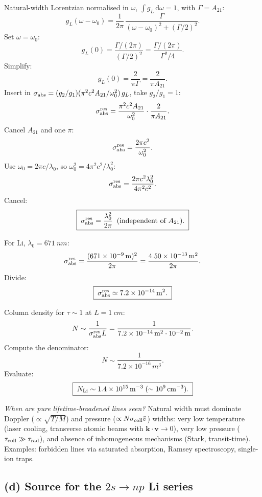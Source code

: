 \documentclass[11pt]{article}
\newcommand{\de}{\mathrm{d}}
\begin{document}
Natural-width Lorentzian normalised in $\omega$, $\int g_L\,\de\omega=1$, with $\Gamma=A_{21}$:
\[
g_L(\omega-\omega_0)=\frac{1}{2\pi}\,\frac{\Gamma}{(\omega-\omega_0)^{2}+(\Gamma/2)^{2}}.
\]
Set $\omega=\omega_0$:
\[
g_L(0)=\frac{\Gamma/(2\pi)}{(\Gamma/2)^{2}}=\frac{\Gamma/(2\pi)}{\Gamma^{2}/4}.
\]
Simplify:
\[
g_L(0)=\frac{2}{\pi\Gamma}=\frac{2}{\pi A_{21}}.
\]
Insert in $\sigma_{\rm abs}=(g_2/g_1)(\pi^2 c^2 A_{21}/\omega_0^2)\,g_L$, take $g_2/g_1=1$:
\[
\sigma_{\rm abs}^{\rm res}=\frac{\pi^{2}c^{2}A_{21}}{\omega_0^{2}}\cdot\frac{2}{\pi A_{21}}.
\]
Cancel $A_{21}$ and one $\pi$:
\[
\sigma_{\rm abs}^{\rm res}=\frac{2\pi c^{2}}{\omega_0^{2}}.
\]
Use $\omega_0=2\pi c/\lambda_0$, so $\omega_0^{2}=4\pi^{2}c^{2}/\lambda_0^{2}$:
\[
\sigma_{\rm abs}^{\rm res}=\frac{2\pi c^{2}\lambda_0^{2}}{4\pi^{2}c^{2}}.
\]
Cancel:
\begin{equation}
\boxed{\;\sigma_{\rm abs}^{\rm res}=\frac{\lambda_0^{2}}{2\pi}\;\;\text{(independent of }A_{21}).\;}
\label{eq:sigma-res}
\end{equation}

For Li, $\lambda_0=\SI{671}{nm}$:
\[
\sigma_{\rm abs}^{\rm res}=\frac{(\SI{671e-9}{m})^{2}}{2\pi}=\frac{4.50\times 10^{-13}\,\si{m^{2}}}{2\pi}.
\]
Divide:
\begin{equation}
\boxed{\;\sigma_{\rm abs}^{\rm res}\simeq\SI{7.2e-14}{m^{2}}.\;}
\label{eq:sigma-Li}
\end{equation}

Column density for $\tau\sim 1$ at $L=\SI{1}{cm}$:
\[
N\sim\frac{1}{\sigma_{\rm abs}^{\rm res}L}=\frac{1}{\SI{7.2e-14}{m^2}\cdot\SI{e-2}{m}}.
\]
Compute the denominator:
\[
N\sim\frac{1}{7.2\times 10^{-16}\,\si{m^{3}}}.
\]
Evaluate:
\begin{equation}
\boxed{\;N_{\rm Li}\sim\SI{1.4e15}{m^{-3}}\;(\sim 10^{9}\,\mathrm{cm^{-3}}).\;}
\label{eq:N-thick}
\end{equation}

\textit{When are pure lifetime-broadened lines seen?} Natural width must dominate Doppler ($\propto\sqrt{T/M}$) and pressure ($\propto N\sigma_{\rm coll}\bar v$) widths: very low temperature (laser cooling, transverse atomic beams with $\bm k\!\cdot\!\bm v\to 0$), very low pressure ($\tau_{\rm coll}\gg\tau_{\rm rad}$), and absence of inhomogeneous mechanisms (Stark, transit-time). Examples: forbidden lines via saturated absorption, Ramsey spectroscopy, single-ion traps.

\subsection*{(d) Source for the $2s\to np$ Li series}
\end{document}
